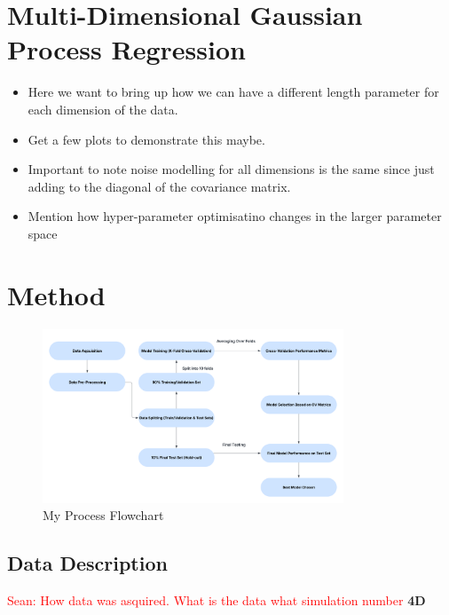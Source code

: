 \documentclass[11pt]{article}
\newcommand{\Sean}[1]{{\textcolor{red}{{Sean: #1}} }}
\begin{document}
\section{Multi-Dimensional Gaussian Process Regression}

\begin{itemize}
    \item Here we want to bring up how we can have a different length parameter for each dimension of the data.
    \item Get a few plots to demonstrate this maybe.
    \item Important to note noise modelling for all dimensions is the same since just adding to the diagonal of the covariance matrix.
    \item Mention how hyper-parameter optimisatino changes in the larger parameter space
\end{itemize}


\section{Method}

\begin{figure}[H]
    \centering
    \includegraphics[width=0.8\textwidth]{LatexPlots/Flowchart.png}
    \caption{My Process Flowchart}
    \label{fig:flowchart}
\end{figure}

\subsection{Data Description}
\Sean{How data was asquired. What is the data what simulation number}
\noindent
\textbf{4D}
\end{document}
